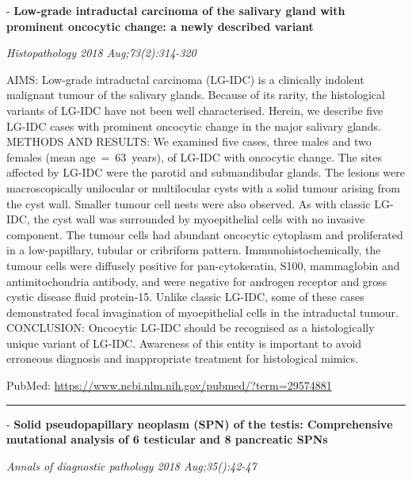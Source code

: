 \documentclass[]{article}
\begin{document}
 - \textbf{Low-grade intraductal carcinoma of the salivary gland with
prominent oncocytic change: a newly described variant}

\emph{Histopathology 2018 Aug;73(2):314-320}

AIMS: Low-grade intraductal carcinoma (LG-IDC) is a clinically indolent
malignant tumour of the salivary glands. Because of its rarity, the
histological variants of LG-IDC have not been well characterised.
Herein, we describe five LG-IDC cases with prominent oncocytic change in
the major salivary glands. METHODS AND RESULTS: We examined five cases,
three males and two females (mean age~=~63~years), of LG-IDC with
oncocytic change. The sites affected by LG-IDC were the parotid and
submandibular glands. The lesions were macroscopically unilocular or
multilocular cysts with a solid tumour arising from the cyst wall.
Smaller tumour cell nests were also observed. As with classic LG-IDC,
the cyst wall was surrounded by myoepithelial cells with no invasive
component. The tumour cells had abundant oncocytic cytoplasm and
proliferated in a low-papillary, tubular or cribriform pattern.
Immunohistochemically, the tumour cells were diffusely positive for
pan-cytokeratin, S100, mammaglobin and antimitochondria antibody, and
were negative for androgen receptor and gross cystic disease fluid
protein-15. Unlike classic LG-IDC, some of these cases demonstrated
focal invagination of myoepithelial cells in the intraductal tumour.
CONCLUSION: Oncocytic LG-IDC should be recognised as a histologically
unique variant of LG-IDC. Awareness of this entity is important to avoid
erroneous diagnosis and inappropriate treatment for histological mimics.

PubMed: \url{https://www.ncbi.nlm.nih.gov/pubmed/?term=29574881}

{}

{}

\begin{center}\rule{0.5\linewidth}{\linethickness}\end{center}

 - \textbf{Solid pseudopapillary neoplasm (SPN) of the testis:
Comprehensive mutational analysis of 6 testicular and 8 pancreatic SPNs}

\emph{Annals of diagnostic pathology 2018 Aug;35():42-47}
\end{document}
